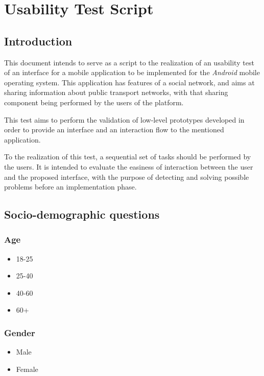 \chapter{Usability Test Script} \label{ap2:usabtest}

\section{Introduction}

This document intends to serve as a script to the realization of an usability test of an interface for a mobile application to be implemented for the \emph{Android} mobile operating system.
This application has features of a social network, and aims at sharing information about public transport networks, with that sharing component being performed by the users of the platform.

This test aims to perform the validation of low-level prototypes developed in order to provide an interface and an interaction flow to the mentioned application.

To the realization of this test, a sequential set of tasks should be performed by the users. It is intended to evaluate the easiness of interaction between the user and the proposed interface, with the purpose of detecting and solving possible problems before an implementation phase.

\section{Socio-demographic questions}

\subsection{Age}
\begin{itemize}
\item 18-25
\item 25-40
\item 40-60
\item 60+
\end{itemize}

\subsection{Gender}
\begin{itemize}
\item Male
\item Female
\end{itemize}

